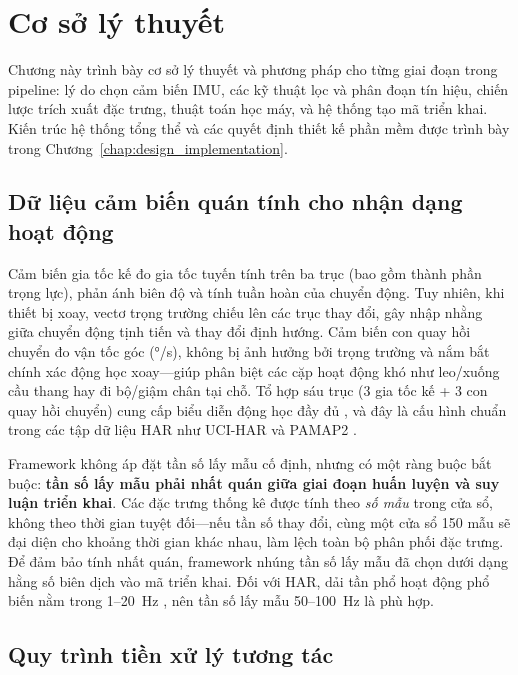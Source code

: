 \chapter{Cơ sở lý thuyết}
\label{chap:methodology}

Chương này trình bày cơ sở lý thuyết và phương pháp cho từng giai đoạn trong pipeline: lý do chọn cảm biến IMU, các kỹ thuật lọc và phân đoạn tín hiệu, chiến lược trích xuất đặc trưng, thuật toán học máy, và hệ thống tạo mã triển khai. Kiến trúc hệ thống tổng thể và các quyết định thiết kế phần mềm được trình bày trong Chương~\ref{chap:design_implementation}.

\section{Dữ liệu cảm biến quán tính cho nhận dạng hoạt động}
\label{sec:imu_data_rationale}

Cảm biến gia tốc kế đo gia tốc tuyến tính trên ba trục (bao gồm thành phần trọng lực), phản ánh biên độ và tính tuần hoàn của chuyển động. Tuy nhiên, khi thiết bị xoay, vectơ trọng trường chiếu lên các trục thay đổi, gây nhập nhằng giữa chuyển động tịnh tiến và thay đổi định hướng. Cảm biến con quay hồi chuyển đo vận tốc góc (°/s), không bị ảnh hưởng bởi trọng trường và nắm bắt chính xác động học xoay---giúp phân biệt các cặp hoạt động khó như leo/xuống cầu thang hay đi bộ/giậm chân tại chỗ. Tổ hợp sáu trục (3 gia tốc kế + 3 con quay hồi chuyển) cung cấp biểu diễn động học đầy đủ \cite{filippeschi2017survey_imu}, và đây là cấu hình chuẩn trong các tập dữ liệu HAR như UCI-HAR \cite{anguita2013har} và PAMAP2 \cite{reiss2012pamap2}.

Framework không áp đặt tần số lấy mẫu cố định, nhưng có một ràng buộc bắt buộc: \textbf{tần số lấy mẫu phải nhất quán giữa giai đoạn huấn luyện và suy luận triển khai}. Các đặc trưng thống kê được tính theo \textit{số mẫu} trong cửa sổ, không theo thời gian tuyệt đối---nếu tần số thay đổi, cùng một cửa sổ 150 mẫu sẽ đại diện cho khoảng thời gian khác nhau, làm lệch toàn bộ phân phối đặc trưng. Để đảm bảo tính nhất quán, framework nhúng tần số lấy mẫu đã chọn dưới dạng hằng số biên dịch vào mã triển khai. Đối với HAR, dải tần phổ hoạt động phổ biến nằm trong 1--20~Hz \cite{whittle2014gait}, nên tần số lấy mẫu 50--100~Hz là phù hợp.

\section{Quy trình tiền xử lý tương tác}

